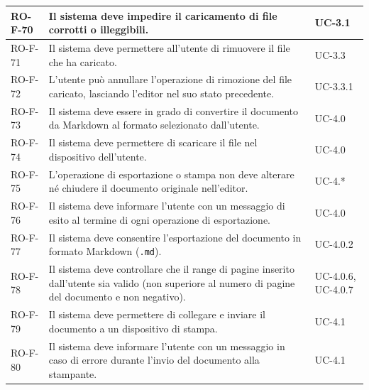 \documentclass[11pt,a4paper]{article}
\begin{document}
\begin{longtable}{|p{}|>{\raggedright\arraybackslash}p{}|p{}|}
\hline
RO-F-70 & Il sistema deve impedire il caricamento di file corrotti o illeggibili. & UC-3.1 \\
\hline
RO-F-71 & Il sistema deve permettere all'utente di rimuovere il file che ha caricato. & UC-3.3 \\
\hline
RO-F-72 & L'utente può annullare l'operazione di rimozione del file caricato, lasciando l'editor nel suo stato precedente. & UC-3.3.1 \\
\hline
RO-F-73 & Il sistema deve essere in grado di convertire il documento da Markdown al formato selezionato dall'utente. & UC-4.0 \\
\hline
RO-F-74 & Il sistema deve permettere di scaricare il file nel dispositivo dell'utente. & UC-4.0 \\
\hline
RO-F-75 & L'operazione di esportazione o stampa non deve alterare né chiudere il documento originale nell'editor. & UC-4.* \\
\hline
RO-F-76 & Il sistema deve informare l'utente con un messaggio di esito al termine di ogni operazione di esportazione. & UC-4.0 \\
\hline
RO-F-77 & Il sistema deve consentire l'esportazione del documento in formato Markdown (\texttt{.md}). & UC-4.0.2 \\
\hline
RO-F-78 & Il sistema deve controllare che il range di pagine inserito dall'utente sia valido (non superiore al numero di pagine del documento e non negativo). & UC-4.0.6, UC-4.0.7 \\
\hline
RO-F-79 & Il sistema deve permettere di collegare e inviare il documento a un dispositivo di stampa. & UC-4.1 \\
\hline
RO-F-80 & Il sistema deve informare l'utente con un messaggio in caso di errore durante l'invio del documento alla stampante. & UC-4.1 \\
\hline


\end{longtable}
\end{document}
